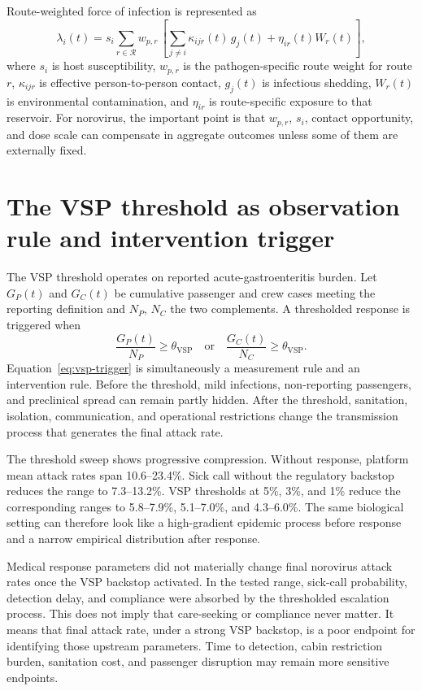 Route-weighted force of infection is represented as
\begin{equation}
  \lambda_i(t)=s_i\sum_{r\in\mathcal{R}} w_{p,r}\,
  \left[\sum_{j\ne i} \kappa_{ijr}(t)\,g_j(t)+\eta_{ir}(t)W_r(t)\right],
  \label{eq:route-foi}
\end{equation}
where \(s_i\) is host susceptibility, \(w_{p,r}\) is the pathogen-specific route weight for route
\(r\), \(\kappa_{ijr}\) is effective person-to-person contact, \(g_j(t)\) is infectious shedding,
\(W_r(t)\) is environmental contamination, and \(\eta_{ir}\) is route-specific exposure to that
reservoir. For norovirus, the important point is that \(w_{p,r}\), \(s_i\), contact opportunity, and dose scale can
compensate in aggregate outcomes unless some of them are externally fixed.

\section{The VSP threshold as observation rule and intervention trigger}
The VSP threshold operates on reported acute-gastroenteritis burden. Let \(G_P(t)\) and \(G_C(t)\) be cumulative
passenger and crew cases meeting the reporting definition and \(N_P\), \(N_C\) the two complements. A thresholded
response is triggered when
\begin{equation}
  \frac{G_P(t)}{N_P}\ge \theta_{\mathrm{VSP}}
  \quad\text{or}\quad
  \frac{G_C(t)}{N_C}\ge \theta_{\mathrm{VSP}}.
  \label{eq:vsp-trigger}
\end{equation}
Equation~\ref{eq:vsp-trigger} is simultaneously a measurement rule and an intervention rule. Before the threshold,
mild infections, non-reporting passengers, and preclinical spread can remain partly hidden. After the threshold,
sanitation, isolation, communication, and operational restrictions change the transmission process that generates
the final attack rate.

The threshold sweep shows progressive compression. Without response, platform mean attack rates span 10.6--23.4\%.
Sick call without the regulatory backstop reduces the range to 7.3--13.2\%. VSP thresholds at 5\%, 3\%, and 1\%
reduce the corresponding ranges to 5.8--7.9\%, 5.1--7.0\%, and 4.3--6.0\%. The same biological setting can
therefore look like a high-gradient epidemic process before response and a narrow empirical distribution after
response.

Medical response parameters did not materially change final norovirus attack rates once the VSP backstop activated.
In the tested range, sick-call probability, detection delay, and compliance were absorbed by the thresholded
escalation process. This does not imply that care-seeking or compliance never matter. It means that final attack
rate, under a strong VSP backstop, is a poor endpoint for identifying those upstream parameters. Time to detection,
cabin restriction burden, sanitation cost, and passenger disruption may remain more sensitive endpoints.

